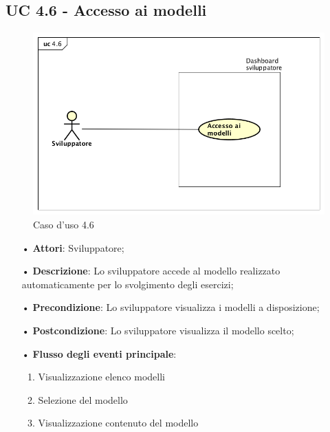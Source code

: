 \subsection{UC 4.6 - Accesso ai modelli}
\begin{figure}[H]
\centering
\includegraphics[width=17cm]{img/UC460.png} 
\caption{Caso d'uso 4.6}\label{fig:460}
\end{figure}
\begin{itemize}
\item[•]\textbf{Attori}: Sviluppatore;
\item[•]\textbf{Descrizione}: Lo sviluppatore accede al modello realizzato automaticamente per lo svolgimento degli esercizi;
\item[•]\textbf{Precondizione}: Lo sviluppatore visualizza i modelli a disposizione;
\item[•]\textbf{Postcondizione}: Lo sviluppatore visualizza il modello scelto;
\item[•]\textbf{Flusso degli eventi principale}:  
\begin{enumerate}
	\item Visualizzazione elenco modelli
	\item Selezione del modello
	\item Visualizzazione contenuto del modello

\end{enumerate}
\end{itemize}